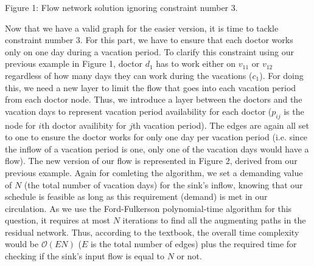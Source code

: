 \vspace*{0.2cm}
{\centering {} \par}
{\centering Figure 1: Flow network solution ignoring constraint number 3.\par}

Now that we have a valid graph for the easier version, it is time to tackle constraint number 3. For this part,
we have to ensure that each doctor works only on one day during a vacation period. To clarify this constraint using our previous example in Figure 1,
doctor $d_1$ has to work either on $v_{11}$ or $v_{12}$ regardless of how many days they can work during the vacations ($c_1$). For doing this, we need 
a new layer to limit the flow that goes into each vacation period from each doctor node. Thus, we introduce a layer between the doctors and the vacation days
to represent vacation period availability for each doctor ($p_{ij}$ is the node for $i$th doctor availibity for $j$th vacation period). The edges are again all set
to one to ensure the doctor works for only one day per vacation period (i.e. since the inflow of a vacation period is one, only one of the
vacation days would have a flow). The new version of our flow is represented in Figure 2, derived from our previous example. 
Again for comleting the algorithm, we set a demanding value of $N$ (the total number of vacation days) for the sink's inflow, knowing that our schedule is feasible as long as this
requirement (demand) is met in our circulation. As we use the Ford-Fulkerson polynomial-time algorithm for this question, it requires at most
$N$ iterations to find all the augmenting paths in the residual network. Thus, according to the textbook, the overall time complexity would be $\mathcal{O}(EN)$ ($E$ is the total number of edges) plus the required time
for checking if the sink's input flow is equal to $N$ or not.

